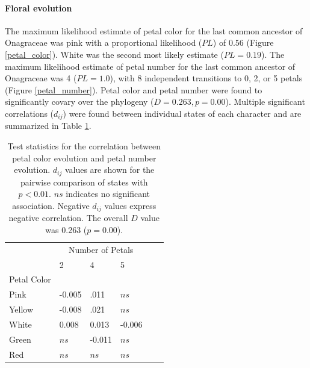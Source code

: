 \documentclass[review]{elsarticle}
\begin{document}
\paragraph{Floral evolution}
The maximum likelihood estimate of petal color for the 
last common ancestor of Onagraceae was pink 
with a proportional likelihood ($PL$) of $0.56$ (Figure \ref{petal_color}).
White was the second most likely estimate ($PL=0.19$).
The maximum likelihood estimate of petal number for the
last common ancestor of Onagraceae was 4 ($PL=1.0$), with 8
independent transitions to 0, 2, or 5 petals (Figure \ref{petal_number}).
Petal color and petal number were found to significantly covary over the 
phylogeny ($D=0.263, p=0.00$). Multiple significant correlations
($d_{ij}$) were found between individual states of each character
and are summarized in Table \ref{correlations}.

\begin{table}
   \center
   \begin{adjustbox}{max width=\textwidth}
      \setlength{\tabcolsep}{20pt}
      \begin{tabular}{llllll}
         \toprule
	 & \multicolumn{3}{c}{Number of Petals} \\
         & 2 & 4 & 5 \\ 
	 \cmidrule{2-4}
	 Petal Color \\
         \hspace{3 mm} Pink & -0.005 & .011 & $ns$ \\
	 \hspace{3 mm} Yellow & -0.008 & .021 & $ns$ \\
	 \hspace{3 mm} White & 0.008 & 0.013 & -0.006 \\
	 \hspace{3 mm} Green & $ns$ & -0.011 & $ns$ \\
	 \hspace{3 mm} Red & $ns$ & $ns$ & $ns$ \\
         \bottomrule
      \end{tabular}
   \end{adjustbox}
   \caption{Test statistics for the correlation between petal color evolution and petal number evolution. 
	    $d_{ij}$ values are shown
            for the pairwise comparison of states with $p< 0.01$. $ns$ indicates no significant
	    association. Negative $d_{ij}$ values express negative correlation.
	    The overall $D$ value was 0.263 ($p=0.00$).
	    }
   \label{correlations}
\end{table}
\end{document}
